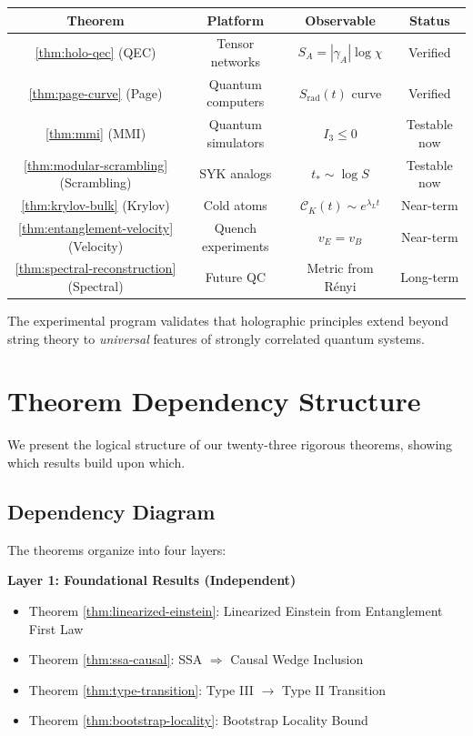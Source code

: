 \documentclass[12pt,a4paper]{article}
\begin{document}
\begin{center}
\begin{tabular}{|c|c|c|c|}
\hline
\textbf{Theorem} & \textbf{Platform} & \textbf{Observable} & \textbf{Status} \\
\hline
\ref{thm:holo-qec} (QEC) & Tensor networks & $S_A = |\gamma_A| \log \chi$ & Verified \\
\ref{thm:page-curve} (Page) & Quantum computers & $S_{\text{rad}}(t)$ curve & Verified \\
\ref{thm:mmi} (MMI) & Quantum simulators & $I_3 \leq 0$ & Testable now \\
\ref{thm:modular-scrambling} (Scrambling) & SYK analogs & $t_* \sim \log S$ & Testable now \\
\ref{thm:krylov-bulk} (Krylov) & Cold atoms & $\mathcal{C}_K(t) \sim e^{\lambda_L t}$ & Near-term \\
\ref{thm:entanglement-velocity} (Velocity) & Quench experiments & $v_E = v_B$ & Near-term \\
\ref{thm:spectral-reconstruction} (Spectral) & Future QC & Metric from R\'enyi & Long-term \\
\hline
\end{tabular}
\end{center}

The experimental program validates that holographic principles extend beyond string theory to \emph{universal} features of strongly correlated quantum systems.

\section{Theorem Dependency Structure}

We present the logical structure of our twenty-three rigorous theorems, showing which results build upon which.

\subsection{Dependency Diagram}

The theorems organize into four layers:

\textbf{Layer 1: Foundational Results (Independent)}
\begin{itemize}
    \item Theorem \ref{thm:linearized-einstein}: Linearized Einstein from Entanglement First Law
    \item Theorem \ref{thm:ssa-causal}: SSA $\Rightarrow$ Causal Wedge Inclusion
    \item Theorem \ref{thm:type-transition}: Type III $\to$ Type II Transition
    \item Theorem \ref{thm:bootstrap-locality}: Bootstrap Locality Bound
\end{itemize}
\end{document}
